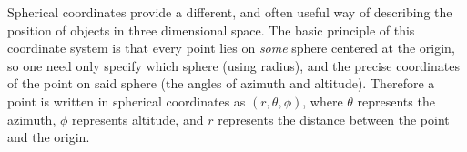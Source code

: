 Spherical coordinates provide a different, and often useful way of describing the position of objects in three dimensional space. The basic principle of this coordinate system is that every point lies on \emph{some} sphere centered at the origin, so one need only specify which sphere (using radius), and the precise coordinates of the point on said sphere (the angles of azimuth and altitude). Therefore a point is written in spherical coordinates as $(r,\theta,\phi)$, where $\theta$ represents the azimuth, $\phi$ represents altitude, and $r$ represents the distance between the point and the origin.


